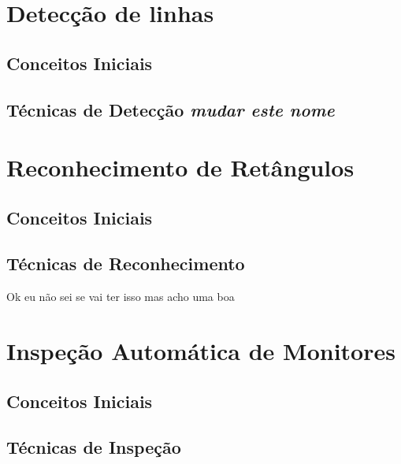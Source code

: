 

\section{Detecção de linhas}

\subsection{Conceitos Iniciais}

\subsection{Técnicas de Detecção \textit{mudar este nome}}

\section{Reconhecimento de Retângulos}

\subsection{Conceitos Iniciais}

\subsection{Técnicas de Reconhecimento}

Ok eu não sei se vai ter isso mas acho uma boa

\section{Inspeção Automática de Monitores}

\subsection{Conceitos Iniciais}

\subsection{Técnicas de Inspeção}

